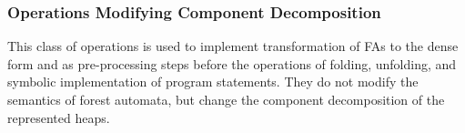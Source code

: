 \subsubsection*{Operations Modifying Component Decomposition}\label{sec:opdec}
This class of operations is used to implement transformation of FAs to the dense form and as
pre-processing steps before the operations of folding, unfolding, and symbolic
implementation of program statements.
%
They do not modify the semantics of forest automata, 
but change the component decomposition of the represented heaps.
%
